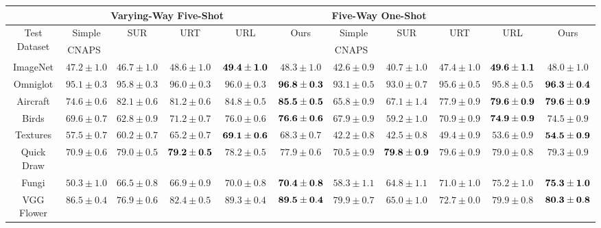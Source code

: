 \begin{table*}[t]
	\centering
	    \resizebox{0.95\textwidth}{!}
    {
		\begin{tabular}{cccccc|ccccc}
			& \multicolumn{4}{c}{Varying-Way Five-Shot} & \multicolumn{4}{c}{Five-Way One-Shot} \\
		    \toprule
		    \multirow{2}{*}{Test Dataset} & Simple & SUR & URT & URL & \multirow{2}{*}{Ours}& Simple & SUR & URT & URL & \multirow{2}{*}{Ours}\\
		    &  CNAPS~\cite{bateni2020improved}  & \cite{dvornik2020selecting} & \cite{liu2020universal} & \cite{li2021universal} & & CNAPS~\cite{bateni2020improved} & \cite{dvornik2020selecting}& \cite{liu2020universal} & \cite{li2021universal} & \\
		    \midrule
		    ImageNet & $47.2\pm1.0$& $46.7\pm1.0$& $48.6\pm1.0$& ${\bf 49.4 \pm 1.0}$ & $48.3 \pm 1.0$ & $42.6\pm0.9$& $40.7\pm1.0$& $47.4\pm1.0$& ${\bf 49.6 \pm 1.1}$ & $48.0 \pm 1.0$ \\
		    Omniglot & $95.1\pm0.3$& $95.8\pm0.3$& $96.0\pm0.3$& $96.0 \pm 0.3$ & ${\bf 96.8 \pm 0.3}$ & $93.1\pm0.5$& $93.0\pm0.7$& $95.6\pm0.5$& $95.8 \pm 0.5$ & ${\bf 96.3 \pm 0.4}$ \\
		    Aircraft & $74.6\pm0.6$& $82.1\pm0.6$& $81.2\pm0.6$& $84.8 \pm 0.5$ & ${\bf 85.5 \pm 0.5}$  & $65.8\pm0.9$&  $67.1\pm1.4$& $77.9\pm0.9$& ${\bf 79.6 \pm 0.9}$ & ${\bf 79.6 \pm 0.9}$ \\
		    Birds & $69.6\pm0.7$& $62.8\pm0.9$& $71.2\pm0.7$& $76.0 \pm 0.6$ & ${\bf 76.6 \pm 0.6}$  &  $67.9\pm0.9$& $59.2\pm1.0$& $70.9\pm0.9$& ${\bf 74.9 \pm 0.9}$ & $74.5 \pm 0.9$ \\
		    Textures & $57.5\pm0.7$& $60.2\pm0.7$& $65.2\pm0.7$& ${\bf 69.1 \pm 0.6}$ & $68.3 \pm 0.7$  &$42.2\pm0.8$& $42.5\pm0.8$& $49.4\pm0.9$& $53.6 \pm 0.9$ & ${\bf 54.5 \pm 0.9}$ \\
		    Quick Draw & $70.9\pm0.6$& $79.0\pm0.5$& ${\bf 79.2\pm0.5}$& $78.2 \pm 0.5$ & $77.9 \pm 0.6$  &$70.5\pm0.9$& ${\bf 79.8\pm0.9}$& $79.6\pm0.9$& $79.0 \pm 0.8$ & $79.3 \pm 0.9$ \\
		    Fungi & $50.3\pm1.0$& $66.5\pm0.8$& $66.9\pm0.9$& $70.0 \pm 0.8$ & ${\bf 70.4 \pm 0.8}$  & $58.3\pm1.1$& $64.8\pm1.1$& $71.0\pm1.0$& $75.2 \pm 1.0$ & ${\bf 75.3 \pm 1.0}$ \\
		    VGG Flower & $86.5\pm0.4$& $76.9\pm0.6$& $82.4\pm0.5$& $89.3 \pm 0.4$ & ${\bf 89.5 \pm 0.4}$  & $79.9\pm0.7$& $65.0\pm1.0$& $72.7\pm0.0$& $79.9 \pm 0.8$ & ${\bf 80.3 \pm 0.8}$ \\

\end{tabular}}
\end{table*}
